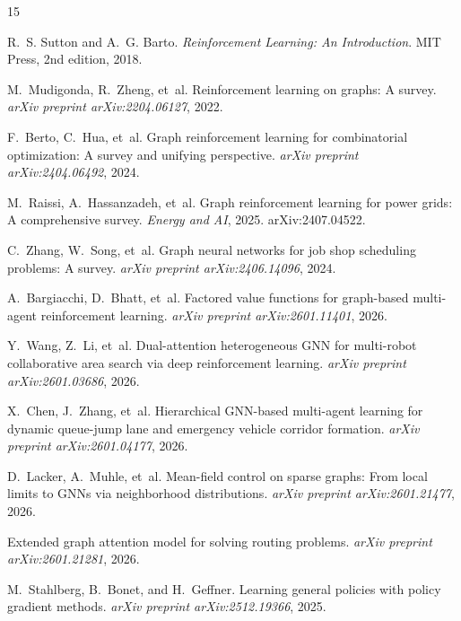 \documentclass{article}
\begin{document}
\begin{thebibliography}{15}

R.~S. Sutton and A.~G. Barto.
\newblock \emph{Reinforcement Learning: An Introduction}.
\newblock MIT Press, 2nd edition, 2018.

M.~Mudigonda, R.~Zheng, et~al.
\newblock Reinforcement learning on graphs: A survey.
\newblock \emph{arXiv preprint arXiv:2204.06127}, 2022.

F.~Berto, C.~Hua, et~al.
\newblock Graph reinforcement learning for combinatorial optimization: A survey and unifying perspective.
\newblock \emph{arXiv preprint arXiv:2404.06492}, 2024.

M.~Raissi, A.~Hassanzadeh, et~al.
\newblock Graph reinforcement learning for power grids: A comprehensive survey.
\newblock \emph{Energy and AI}, 2025.
\newblock arXiv:2407.04522.

C.~Zhang, W.~Song, et~al.
\newblock Graph neural networks for job shop scheduling problems: A survey.
\newblock \emph{arXiv preprint arXiv:2406.14096}, 2024.

A.~Bargiacchi, D.~Bhatt, et~al.
\newblock Factored value functions for graph-based multi-agent reinforcement learning.
\newblock \emph{arXiv preprint arXiv:2601.11401}, 2026.

Y.~Wang, Z.~Li, et~al.
\newblock Dual-attention heterogeneous {GNN} for multi-robot collaborative area search via deep reinforcement learning.
\newblock \emph{arXiv preprint arXiv:2601.03686}, 2026.

X.~Chen, J.~Zhang, et~al.
\newblock Hierarchical {GNN}-based multi-agent learning for dynamic queue-jump lane and emergency vehicle corridor formation.
\newblock \emph{arXiv preprint arXiv:2601.04177}, 2026.

D.~Lacker, A.~Muhle, et~al.
\newblock Mean-field control on sparse graphs: From local limits to {GNNs} via neighborhood distributions.
\newblock \emph{arXiv preprint arXiv:2601.21477}, 2026.

Extended graph attention model for solving routing problems.
\newblock \emph{arXiv preprint arXiv:2601.21281}, 2026.

M.~Stahlberg, B.~Bonet, and H.~Geffner.
\newblock Learning general policies with policy gradient methods.
\newblock \emph{arXiv preprint arXiv:2512.19366}, 2025.


\end{thebibliography}
\end{document}
